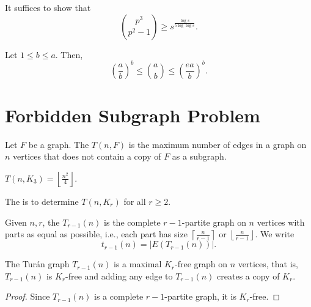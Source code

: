 It suffices to show that
\begin{equation}
    \binom{p^3}{p^2 - 1} \geq s^{\frac{\log s}{5 \log \log s}}.
\end{equation}

\begin{lemma}
    Let \(1 \leq b \leq a\).
    Then,
    \begin{equation}
        \left( \frac{a}{b} \right)^b \leq \binom{a}{b} \leq \left( \frac{ea}{b} \right)^b.
    \end{equation}
\end{lemma}

\section{Forbidden Subgraph Problem}

\begin{definition}
    Let \(F\) be a graph.
    The  \(T(n, F)\) is the maximum number of edges in a graph on \(n\) vertices that does not contain a copy of \(F\) as a subgraph.
\end{definition}

\begin{example}
    \(T(n, K_3) = \left\lfloor \frac{n^2}{4} \right\rfloor\).
\end{example}

The  is to determine \(T(n, K_r)\) for all \(r \geq 2\).

Given \(n, r\),
the  \(T_{r-1}(n)\) is the complete \(r-1\)-partite graph on \(n\) vertices with parts as equal as possible,
i.e., each part has size \(\left\lceil \frac{n}{r-1} \right\rceil\) or \(\left\lfloor \frac{n}{r-1} \right\rfloor\).
We write
\begin{equation}
    t_{r-1}(n) = |E(T_{r-1}(n))|.
\end{equation}

\begin{lemma}
    The Turán graph \(T_{r-1}(n)\) is a maximal \(K_r\)-free graph on \(n\) vertices, that is,
    \(T_{r-1}(n)\) is \(K_r\)-free and adding any edge to \(T_{r-1}(n)\) creates a copy of \(K_r\).
\end{lemma}

\begin{proof}
    Since \(T_{r-1}(n)\) is a complete \(r-1\)-partite graph,
    it is \(K_r\)-free.
\end{proof}

